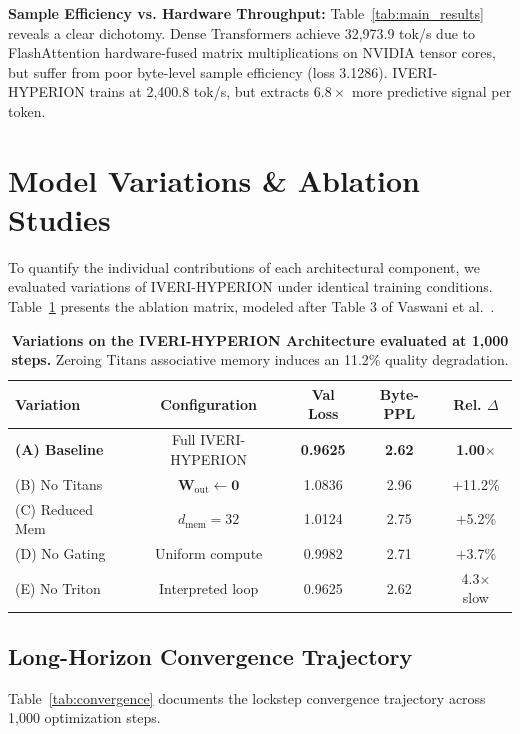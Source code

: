 \documentclass[10pt,twocolumn,letterpaper]{article}
\begin{document}
\textbf{Sample Efficiency vs. Hardware Throughput:} Table~\ref{tab:main_results} reveals a clear dichotomy. Dense Transformers achieve 32,973.9 tok/s due to FlashAttention hardware-fused matrix multiplications on NVIDIA tensor cores, but suffer from poor byte-level sample efficiency (loss 3.1286). IVERI-HYPERION trains at 2,400.8 tok/s, but extracts $6.8\times$ more predictive signal per token.

\section{Model Variations \& Ablation Studies}
\label{sec:ablations}

To quantify the individual contributions of each architectural component, we evaluated variations of IVERI-HYPERION under identical training conditions. Table~\ref{tab:ablations} presents the ablation matrix, modeled after Table 3 of Vaswani et al.~\cite{vaswani2017attention}.

\begin{table}[h]
\centering
\small
\caption{\textbf{Variations on the IVERI-HYPERION Architecture evaluated at 1,000 steps.} Zeroing Titans associative memory induces an 11.2\% quality degradation.}
\label{tab:ablations}
\begin{tabular}{lcccc}
\toprule
\textbf{Variation} & \textbf{Configuration} & \textbf{Val Loss} & \textbf{Byte-PPL} & \textbf{Rel. $\Delta$} \\
\midrule
\textbf{(A) Baseline} & Full IVERI-HYPERION & \textbf{0.9625} & \textbf{2.62} & \textbf{1.00$\times$} \\
(B) No Titans & $\mathbf{W}_{\text{out}} \leftarrow \mathbf{0}$ & 1.0836 & 2.96 & +11.2\% \\
(C) Reduced Mem & $d_{\text{mem}} = 32$ & 1.0124 & 2.75 & +5.2\% \\
(D) No Gating & Uniform compute & 0.9982 & 2.71 & +3.7\% \\
(E) No Triton & Interpreted loop & 0.9625 & 2.62 & 4.3$\times$ slow \\
\bottomrule
\end{tabular}
\end{table}

\subsection{Long-Horizon Convergence Trajectory}
Table~\ref{tab:convergence} documents the lockstep convergence trajectory across 1,000 optimization steps.
\end{document}
